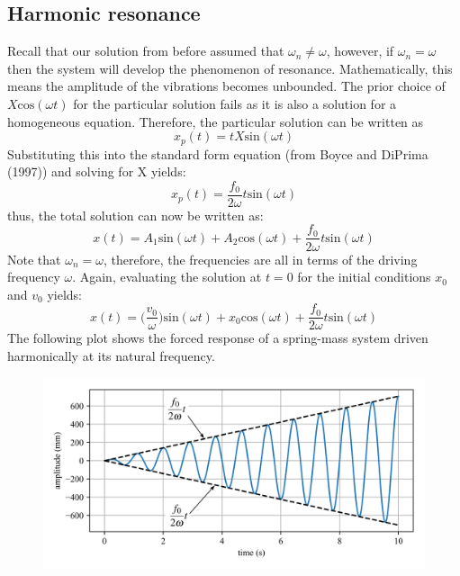 \documentclass[12pt,letter]{article}
\numberwithin{ex}{section} %
\numberwithin{re}{section} %
\begin{document}
			
		\subsection{Harmonic resonance}			
			
			Recall that our solution from before assumed that $\omega_n \neq \omega$, however, if $\omega_n = \omega$ then the system will develop the phenomenon of resonance. Mathematically, this means the amplitude of the vibrations becomes unbounded. The prior choice of $X\text{cos}(\omega t)$ for the particular solution fails as it is also a solution for a homogeneous equation. Therefore, the particular solution can be written as 
			\begin{equation}
				x_p(t) = t X\text{sin}(\omega t)
			\end{equation}				
			Substituting this into the standard form equation (from Boyce and DiPrima (1997)) and solving for X yields:
			\begin{equation}
				x_p(t) = \frac{f_0}{2 \omega} t \text{sin}(\omega t)
			\end{equation}	
			thus, the total solution can now be written as:
			\begin{equation}
				x(t) = A_1\text{sin}(\omega t) + A_2\text{cos}(\omega t) + \frac{f_0}{2 \omega} t \text{sin}(\omega t)
			\end{equation}			
			Note that $\omega_n=\omega$, therefore, the frequencies are all in terms of the driving frequency $\omega$. Again, evaluating the solution at $t=0$ for the initial conditions $x_0$ and $v_0$ yields:
			\begin{equation}
				x(t) = \Big(\frac{v_0}{\omega}\Big)\text{sin}(\omega t) + x_0\text{cos}(\omega t) + \frac{f_0}{2 \omega} t \text{sin}(\omega t)
			\end{equation}			
			The following plot shows the forced response of a spring-mass system driven harmonically at its natural frequency.
			\begin{figure}[H]
				\centering
				\includegraphics[]{../Figures/resonance.png}
			\end{figure}				
\end{document}
